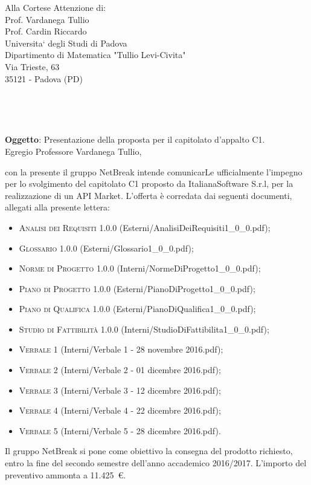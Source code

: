 \documentclass[11pt,a4paper]{letter}
\def\opening#1{\thispagestyle{empty}
{\centering\fromaddress \vspace{0.6in} \\ %
\hspace*{\longindentation}\hspace*{\fill}\par} %
{\raggedright \toname \\ \toaddress \par} %
\vspace{0.1in} %
\noindent #1 %
}
\begin{document}

\begin{letter}
{Alla Cortese Attenzione di:\\
	Prof. Vardanega Tullio\\
	Prof. Cardin Riccardo\\
	Universita` degli Studi di Padova\\
	Dipartimento di Matematica "Tullio Levi-Civita"\\
	Via Trieste, 63\\
	35121 - Padova (PD)\\
}



\opening {\textbf{Oggetto}: Presentazione della proposta per il capitolato d'appalto C1.}\\

\noindent Egregio Professore Vardanega Tullio,

\indent con la presente il gruppo NetBreak intende comunicarLe ufficialmente l'impegno per lo svolgimento del capitolato C1 proposto da ItalianaSoftware S.r.l, per la realizzazione di un API Market.
L'offerta \`e corredata dai seguenti documenti, allegati alla presente lettera:
\begin{itemize}
	\item \textsc{Analisi dei Requisiti 1.0.0} (Esterni/AnalisiDeiRequisiti1\_0\_0.pdf); 
	\item \textsc{Glossario 1.0.0} (Esterni/Glossario1\_0\_0.pdf); 
	\item \textsc{Norme di Progetto 1.0.0} (Interni/NormeDiProgetto1\_0\_0.pdf); 
	\item \textsc{Piano di Progetto 1.0.0} (Esterni/PianoDiProgetto1\_0\_0.pdf); 
	\item \textsc{Piano di Qualifica 1.0.0} (Esterni/PianoDiQualifica1\_0\_0.pdf); 
	\item \textsc{Studio di Fattibilit\`a 1.0.0} (Interni/StudioDiFattibilita1\_0\_0.pdf); 
	\item \textsc{Verbale 1} (Interni/Verbale 1 - 28 novembre 2016.pdf); 
	\item \textsc{Verbale 2} (Interni/Verbale 2 - 01 dicembre 2016.pdf); 
	\item \textsc{Verbale 3} (Interni/Verbale 3 - 12 dicembre 2016.pdf); 
	\item \textsc{Verbale 4} (Interni/Verbale 4 - 22 dicembre 2016.pdf); 
	\item \textsc{Verbale 5} (Interni/Verbale 5 - 28 dicembre 2016.pdf). 
\end{itemize}
	Il gruppo NetBreak si pone come obiettivo la consegna del prodotto richiesto, entro la fine del secondo semestre dell'anno accademico 2016/2017. L'importo del preventivo ammonta a \hbox{11.425 \euro{}.}


\end{letter}
\end{document}
